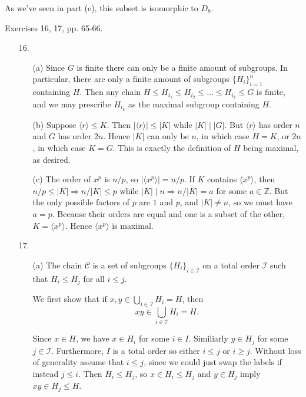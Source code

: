 \documentclass[12pt]{article}
\theoremstyle{remark}
\theoremstyle{named}
\renewcommand{\implies}{\Rightarrow}
\begin{document}
\begin{enumerate}
\begin{enumerate}
        As we've seen in part (e), this subset is isomorphic to \(D_8\).
    \end{enumerate}
\end{enumerate}

Exercises 16, 17, pp. 65-66.

\begin{enumerate}
    \item [16.] 
    \begin{enumerate}
        \item[(a)] Since \(G\) is finite there can only be a finite amount of subgroups. In particular, there are only a finite amount of subgroups \(\{H_i\}_{i = 1}^n\) containing \(H\). Then any chain \(H \le H_{i_1} \le H_{i_2} \le \dots \le H_{i_k} \le G\) is finite, and we may prescribe \(H_{i_k}\) as the maximal subgroup containing \(H\).
        
        \item[(b)] Suppose \(\langle r \rangle \le K\). Then \(|\langle r \rangle| \le |K|\) while \(|K| \mid |G|\). But \(\langle r \rangle\) has order \(n\) and \(G\) has order \(2n\). Hence \(|K|\) can only be \(n\), in which case \(H = K\), or \(2n\), in which case \(K = G\). This is exactly the definition of \(H\) being maximal, as desired.
         
        \item[(c)] The order of \(x^p\) is \(n / p\), so \(|\langle x^p \rangle| = n / p\). If \(K\) contains \(\langle x^p \rangle\), then \(n/p \le |K| \implies n / |K| \le p\) while \(|K| \mid n \implies n / |K| = a\) for some \(a \in \mathbb Z\). But the only possible factors of \(p\) are \(1\) and \(p\), and \(|K| \neq n\), so we must have \(a = p\). Because their orders are equal and one is a subset of the other, \(K = \langle x^p \rangle\). Hence \(\langle x^p \rangle\) is maximal.
    \end{enumerate}
    \item [17.] 
    \begin{enumerate}
        \item[(a)] The chain \(\mathcal C\) is a set of subgroups \(\{H_i\}_{i \in \mathcal I}\) on a total order \(\mathcal I\) such that \(H_i \le H_j\) for all \(i \le j\). 
        
        We first show that if 
        \(x, y \in \bigcup_{i \in \mathcal I} H_i = H\), then \[xy \in \bigcup_{i \in \mathcal I} H_i = H.\]

        Since \(x \in H\), we have \(x \in H_i\) for some \(i \in I\). Similiarly \(y \in H_j\) for some \(j \in \mathcal I\). Furthermore, \(I\) is a total order so either \(i \le j\) or \(i \ge j\). Without loss of generality assume that \(i \le j\), since we could just swap the labels if instead \(j \le i\). Then \(H_i \le H_j\), so \(x \in H_i \le H_j\) and \(y \in H_j\) imply \(xy \in H_j \le H\).


\end{enumerate}
\end{enumerate}
\end{document}
